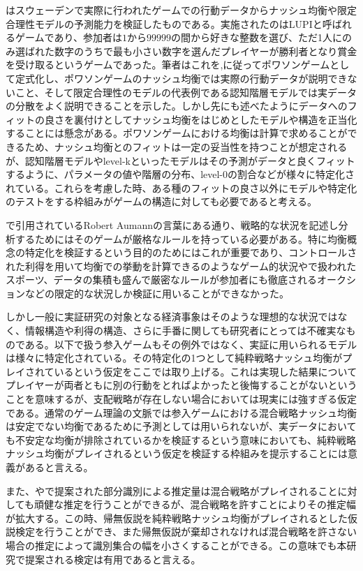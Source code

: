 \documentclass{jsarticle}
\begin{document}
\cite{Ostling2011}はスウェーデンで実際に行われたゲームでの行動データからナッシュ均衡や限定合理性モデルの予測能力を検証したものである。実施されたのはLUPIと呼ばれるゲームであり、参加者は$1$から$99999$の間から好きな整数を選び、ただ1人にのみ選ばれた数字のうちで最も小さい数字を選んだプレイヤーが勝利者となり賞金を受け取るというゲームであった。筆者はこれを\cite{Myerson1998},\cite{Myerson2000}に従ってポワソンゲームとして定式化し、ポワソンゲームのナッシュ均衡では実際の行動データが説明できないこと、そして限定合理性のモデルの代表例である認知階層モデルでは実データの分散をよく説明できることを示した。しかし先にも述べたようにデータへのフィットの良さを裏付けとしてナッシュ均衡をはじめとしたモデルや構造を正当化することには懸念がある。ポワソンゲームにおける均衡は計算で求めることができるため、ナッシュ均衡とのフィットは一定の妥当性を持つことが想定されるが、認知階層モデルやlevel-kといったモデルはその予測がデータと良くフィットするように、パラメータの値や階層の分布、level-0の割合などが様々に特定化されている。これらを考慮した時、ある種のフィットの良さ以外にモデルや特定化のテストをする枠組みがゲームの構造に対しても必要であると考える。

\cite{Ostling2011}で引用されているRobert Aumannの言葉にある通り、戦略的な状況を記述し分析するためにはそのゲームが厳格なルールを持っている必要がある。特に均衡概念の特定化を検証するという目的のためにはこれが重要であり、コントロールされた利得を用いて均衡での挙動を計算できる\cite{Ostling2011}のようなゲーム的状況や\cite{Chiappori2002}で扱われたスポーツ、データの集積も盛んで厳密なルールが参加者にも徹底されるオークションなどの限定的な状況しか検証に用いることができなかった。

しかし一般に実証研究の対象となる経済事象はそのような理想的な状況ではなく、情報構造や利得の構造、さらに手番に関しても研究者にとっては不確実なものである。以下で扱う参入ゲームもその例外ではなく、実証に用いられるモデルは様々に特定化されている。その特定化の1つとして純粋戦略ナッシュ均衡がプレイされているという仮定をここでは取り上げる。これは実現した結果についてプレイヤーが両者ともに別の行動をとればよかったと後悔することがないということを意味するが、支配戦略が存在しない場合においては現実には強すぎる仮定である。通常のゲーム理論の文脈では参入ゲームにおける混合戦略ナッシュ均衡は安定でない均衡であるために予測としては用いられないが、実データにおいても不安定な均衡が排除されているかを検証するという意味においても、純粋戦略ナッシュ均衡がプレイされるという仮定を検証する枠組みを提示することには意義があると言える。

また、\cite{Tamer2003a}や\cite{Ciliberto2009a}で提案された部分識別による推定量は混合戦略がプレイされることに対しても頑健な推定を行うことができるが、混合戦略を許すことによりその推定幅が拡大する。この時、帰無仮説を純粋戦略ナッシュ均衡がプレイされるとした仮説検定を行うことができ、また帰無仮説が棄却されなければ混合戦略を許さない場合の推定によって識別集合の幅を小さくすることができる。この意味でも本研究で提案される検定は有用であると言える。
\end{document}
